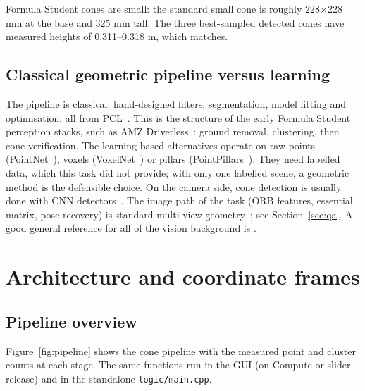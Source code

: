 \documentclass[10pt,a4paper]{scrartcl}
\renewcommand{\emph}[1]{\textcolor{accent}{#1}}
\newcommand{\file}[1]{\texttt{\small #1}}
\newcommand{\RuleSection}[1]{%
    \section{#1}%
    \vspace{0.2em}{\color{accent!35}\hrule height 0.4pt}\vspace{0.3em}%
  }
\begin{document}
  Formula Student cones are small: the standard small cone is roughly
  228$\times$228 mm at the base and 325 mm tall. The three best-sampled detected
  cones have measured heights of 0.311--0.318 m, which matches.

  \subsection{Classical geometric pipeline versus learning}

  The pipeline is \emph{classical}: hand-designed filters, segmentation, model
  fitting and optimisation, all from PCL~\citep{rusu2011pcl}. This is the structure
  of the early Formula Student perception stacks, such as AMZ
  Driverless~\citep{kabzan2020amz,gosala2019redundant}: ground removal, clustering,
  then cone verification. The learning-based alternatives operate on raw points
  (PointNet~\citep{qi2017pointnet}), voxels (VoxelNet~\citep{zhou2018voxelnet}) or
  pillars (PointPillars~\citep{lang2019pointpillars}). They need labelled data,
  which this task did not provide; with only one labelled scene, a geometric method
  is the defensible choice. On the camera side, cone detection is usually done with
  CNN detectors~\citep{dhall2019real}. The image path of the task (ORB features,
  essential matrix, pose recovery) is standard multi-view
  geometry~\citep{rublee2011orb,nister2004efficient,hartley2004multiple}; see
  Section~\ref{sec:qa}. A good general reference for all of the vision background is
  \citet{szeliski2022computer}.

  \RuleSection{Architecture and coordinate frames}
  \label{sec:frames}

  \subsection{Pipeline overview}

  Figure~\ref{fig:pipeline} shows the cone pipeline with the measured point and
  cluster counts at each stage. The same functions run in the GUI (on \emph{Compute}
  or slider release) and in the standalone \file{logic/main.cpp}.
\end{document}

